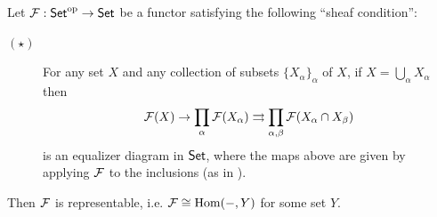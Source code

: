 \begin{theorem}\label{thm:chap:sheaves:sec:intro:sheaves are representable}
    Let $\cal{F} : \Set^\op \to \Set$ be a functor satisfying the following ``sheaf condition'':
    \begin{description}
        \item[$(\star)$] For any set $X$ and any collection of subsets $\{X_\alpha\}_\alpha$ of $X$, if $X = \bigcup_\alpha X_\alpha$ then
              \[\cal{F}(X) \to \prod_\alpha \cal{F}(X_\alpha) \rightrightarrows \prod_{\alpha, \beta} \cal{F}(X_\alpha \cap X_\beta)\]
              is an equalizer diagram in $\Set$, where the maps above are given by applying $\cal{F}$ to the inclusions (as in ).
    \end{description}
    Then $\cal{F}$ is representable, i.e. $\cal{F} \cong \Hom({-},Y)$ for some set $Y$.
\end{theorem}
